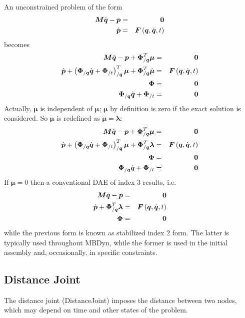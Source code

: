 \documentclass[10pt,dvips,fleqn]{report}
\newcommand{\T}[1]{\boldsymbol{#1}}
\begin{document}
An unconstrained problem of the form
\begin{eqnarray*}
	\T{M} \dot{\T{q}} - \T{p} & = & \T{0} \\
	\dot{\T{p}} & = & \T{F}\plbr{\T{q}, \dot{\T{q}}, t}
\end{eqnarray*}
becomes
\begin{eqnarray*}
	\T{M} \dot{\T{q}} - \T{p} + \T{\Phi}_{/\T{q}}^T \T{\mu} & = & \T{0} \\
	\dot{\T{p}} + \plbr{
		\T{\Phi}_{/\T{q}} \dot{\T{q}}
		+ \T{\Phi}_{/t}
	}_{/\T{q}}^T \T{\mu}
	+ \T{\Phi}_{/\T{q}}^T \dot{\T{\mu}} & = & \T{F}\plbr{\T{q}, \dot{\T{q}}, t} \\
	\T{\Phi} & = & \T{0} \\
	\T{\Phi}_{/\T{q}} \dot{\T{q}} + \T{\Phi}_{/t} & = & \T{0}
\end{eqnarray*}
Actually, $\dot{\T{\mu}}$ is independent of $\T{\mu}$;
$\T{\mu}$ by definition is zero if the exact solution is considered.
So $\dot{\T{\mu}}$ is redefined as $\dot{\T{\mu}}=\T{\lambda}$:
\begin{eqnarray*}
	\T{M} \dot{\T{q}} - \T{p} + \T{\Phi}_{/\T{q}}^T \T{\mu} & = & \T{0} \\
	\dot{\T{p}} + \plbr{
		\T{\Phi}_{/\T{q}} \dot{\T{q}}
		+ \T{\Phi}_{/t}
	}_{/\T{q}}^T \T{\mu} + \T{\Phi}_{/\T{q}}^T \T{\lambda}
		& = & \T{F}\plbr{\T{q}, \dot{\T{q}}, t} \\
	\T{\Phi} & = & \T{0} \\
	\T{\Phi}_{/\T{q}} \dot{\T{q}} + \T{\Phi}_{/t} & = & \T{0}
\end{eqnarray*}
If $\T{\mu}=0$ then a conventional DAE of index 3 results, i.e.
\begin{eqnarray*}
	\T{M} \dot{\T{q}} - \T{p} & = & \T{0} \\
	\dot{\T{p}} + \T{\Phi}_{/\T{q}}^T \T{\lambda}
		& = & \T{F}\plbr{\T{q}, \dot{\T{q}}, t} \\
	\T{\Phi} & = & \T{0}
\end{eqnarray*}
while the previous form is known as stabilized index 2 form.
The latter is typically used throughout MBDyn, while the former is used 
in the initial assembly and, occasionally, in specific constraints.

\subsection{Distance Joint}
\label{sec:DistanceJoint}
The distance joint (DistanceJoint) imposes the distance between two nodes,
which may depend on time and other states of the problem.
\end{document}
